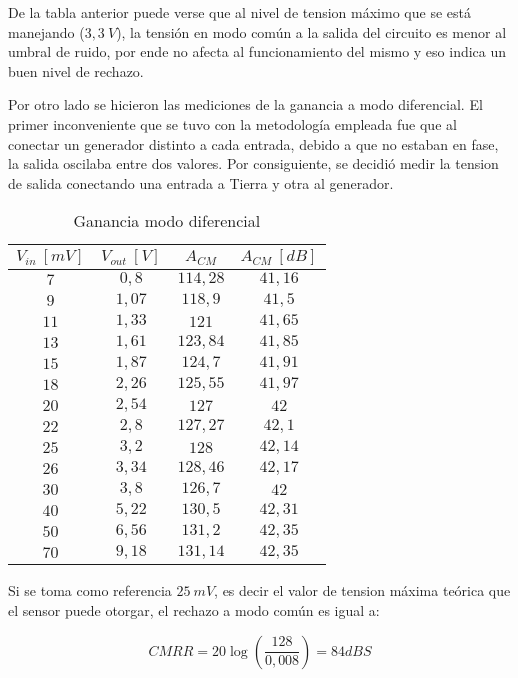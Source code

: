 De la tabla anterior puede verse que al nivel de tension m\'aximo que se est\'a manejando ($3,3 \ V$), la tensión en modo com\'un a la salida del circuito es menor al umbral de ruido, por ende no afecta al funcionamiento del mismo y eso indica un buen nivel de rechazo.

Por otro lado se hicieron las mediciones de la ganancia a modo diferencial. El primer inconveniente que se tuvo con la metodolog\'ia empleada fue que al conectar un generador distinto a cada entrada, debido a que no estaban en fase, la salida oscilaba entre dos valores. Por consiguiente, se decidi\'o medir la tension de salida conectando una entrada a Tierra y otra al generador. 

\begin{table}[H]
\centering
\begin{tabular}{cccc}\hline
$V_{in} \ [mV]$ & $V_{out} \ [V]$ & $A_{CM}$ & $A_{CM} \ [dB]$ \\
\hline
$7$   & $0,8$  & $114,28$ & $41,16$ \\
$9$  & $1,07$ & $118,9$ & $41,5$\\
$11$  & $1,33$ & $121$ & $41,65$\\
$13$  & $1,61$ & $123,84$ & $41,85$\\
$15$  & $1,87$ & $124,7$ & $41,91$\\
$18$  & $2,26$ & $125,55$ & $41,97$\\
$20$  & $2,54$ & $127$ & $42$\\
$22$  & $2,8$ & $127,27$ & $42,1$\\
$25$  & $3,2$ & $128$ & $42,14$\\
$26$  & $3,34$ & $128,46$ & $42,17$\\
$30$  & $3,8$ & $126,7$ & $42$\\
$40$  & $5,22$ & $130,5$ & $42,31$\\
$50$  & $6,56$ & $131,2$ & $42,35$\\
$70$  & $9,18$ & $131,14$ & $42,35$\\ \hline
\end{tabular}
\caption{Ganancia modo diferencial}
\label{table:ganancia_diferencial}
\end{table}

Si se toma como referencia $25 \ mV$, es decir el valor de tension m\'axima te\'orica que el sensor puede otorgar, el rechazo a modo común es igual a:

\begin{equation}
CMRR = 20\log(\frac{128}{0,008}) = \boxed{84 dBS}
\end{equation}

